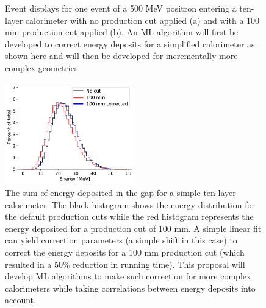\documentclass[letter, USenglish, 11pt, subfigure]{article}
\begin{document}
\begin{figure}[!htbp]
  \centering
  \caption{Event displays for one event of a 500 MeV positron entering a ten-layer calorimeter with no production cut applied (a) and with a 100 mm production cut applied (b). An ML algorithm will first be developed to correct energy deposits for a simplified calorimeter as shown here and will then be developed for incrementally more complex geometries. }
  \label{fig:rangeCutShower}
\end{figure}


\begin{figure}

  \centering
  \includegraphics[width=0.5\textwidth]{figures/egapSumNN.pdf}
  \caption{\label{fig:simpleCorr} The sum of energy deposited in the gap for a simple ten-layer calorimeter. The black histogram shows the energy distribution for the default production cuts while the red histogram represents the energy deposited for a production cut of 100 mm. A simple linear fit can yield correction parameters (a simple shift in this case) to correct the energy deposits for a 100 mm production cut (which resulted in a 50\% reduction in running time). This proposal will develop ML algorithms to make such correction for more complex calorimeters while taking correlations between energy deposits into account. }
\end{figure}
  
\end{document}
